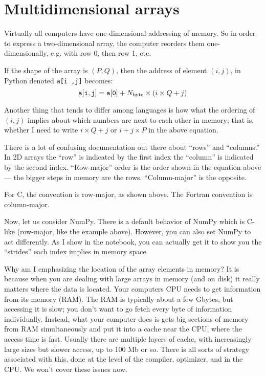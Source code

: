 \section{Multidimensional arrays}

Virtually all computers have one-dimensional addressing of memory. So
in order to express a two-dimensional array, the computer reorders
them one-dimensionally, e.g. with row 0, then row 1, etc.


\begin{answer}
If the
shape of the array is $(P, Q)$, then the address of element $(i,j)$,
in Python denoted {\tt{a[i ,j]}} becomes:
\begin{equation}
  {\tt a[i, j]} = {\tt a[0]} + N_{\rm byte} \times (i \times Q + j)
\end{equation}

Another thing that tends to differ among languages is how what the
ordering of $(i, j)$ implies about which numbers are next to each
other in memory; that is, whether I need to write $i\times Q +j$ or $i
+ j\times P$ in the above equation.

There is a lot of confusing documentation out there about ``rows'' and
``columns.'' In 2D arrays the ``row'' is indicated by the first index
the ``column'' is indicated by the second index. ``Row-major'' order
is the order shown in the equation above --- the bigger steps in
memory are the rows.  ``Column-major'' is the opposite.

For C, the convention is row-major, as shown above. The Fortran
convention is column-major.

Now, let us consider NumPy. There is a default behavior of NumPy which
is C-like (row-major, like the example above). However, you can also
set NumPy to act differently. As I show in the notebook, you can
actually get it to show you the ``strides'' each index implies in
memory space.
\end{answer}

Why am I emphasizing the location of the array elements in memory? It
is because when you are dealing with large arrays in memory (and on
disk) it really matters where the data is located. Your computers CPU
needs to get information from its memory (RAM). The RAM is typically
about a few Gbytes, but accessing it is slow; you don't want to go
fetch every byte of information individually. Instead, what your
computer does is gets big sections of memory from RAM simultaneously
and put it into a cache near the CPU, where the access time is
fast. Usually there are multiple layers of cache, with increasingly
large sizes but slower access, up to 100 Mb or so. There is all sorts
of strategy associated with this, done at the level of the compiler,
optimizer, and in the CPU. We won't cover these issues now.

